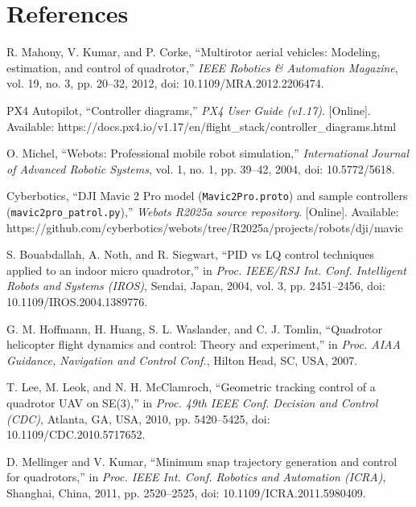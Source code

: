 \section{References}
\begin{enumerate}[label={[\arabic*]},leftmargin=*,itemsep=2pt]
\item R. Mahony, V. Kumar, and P. Corke, ``Multirotor aerial vehicles: Modeling, estimation, and control of quadrotor,'' \textit{IEEE Robotics \& Automation Magazine}, vol. 19, no. 3, pp. 20--32, 2012, doi: 10.1109/MRA.2012.2206474.
\item PX4 Autopilot, ``Controller diagrams,'' \textit{PX4 User Guide (v1.17)}. [Online]. Available: https://docs.px4.io/v1.17/en/flight\_stack/controller\_diagrams.html
\item O. Michel, ``Webots: Professional mobile robot simulation,'' \textit{International Journal of Advanced Robotic Systems}, vol. 1, no. 1, pp. 39--42, 2004, doi: 10.5772/5618.
\item Cyberbotics, ``DJI Mavic 2 Pro model (\texttt{Mavic2Pro.proto}) and sample controllers (\texttt{mavic2pro\_patrol.py}),'' \textit{Webots R2025a source repository}. [Online]. Available: https://github.com/cyberbotics/webots/tree/R2025a/projects/robots/dji/mavic
\item S. Bouabdallah, A. Noth, and R. Siegwart, ``PID vs LQ control techniques applied to an indoor micro quadrotor,'' in \textit{Proc. IEEE/RSJ Int. Conf. Intelligent Robots and Systems (IROS)}, Sendai, Japan, 2004, vol. 3, pp. 2451--2456, doi: 10.1109/IROS.2004.1389776.
\item G. M. Hoffmann, H. Huang, S. L. Waslander, and C. J. Tomlin, ``Quadrotor helicopter flight dynamics and control: Theory and experiment,'' in \textit{Proc. AIAA Guidance, Navigation and Control Conf.}, Hilton Head, SC, USA, 2007.
\item T. Lee, M. Leok, and N. H. McClamroch, ``Geometric tracking control of a quadrotor UAV on SE(3),'' in \textit{Proc. 49th IEEE Conf. Decision and Control (CDC)}, Atlanta, GA, USA, 2010, pp. 5420--5425, doi: 10.1109/CDC.2010.5717652.
\item D. Mellinger and V. Kumar, ``Minimum snap trajectory generation and control for quadrotors,'' in \textit{Proc. IEEE Int. Conf. Robotics and Automation (ICRA)}, Shanghai, China, 2011, pp. 2520--2525, doi: 10.1109/ICRA.2011.5980409.

\end{enumerate}
